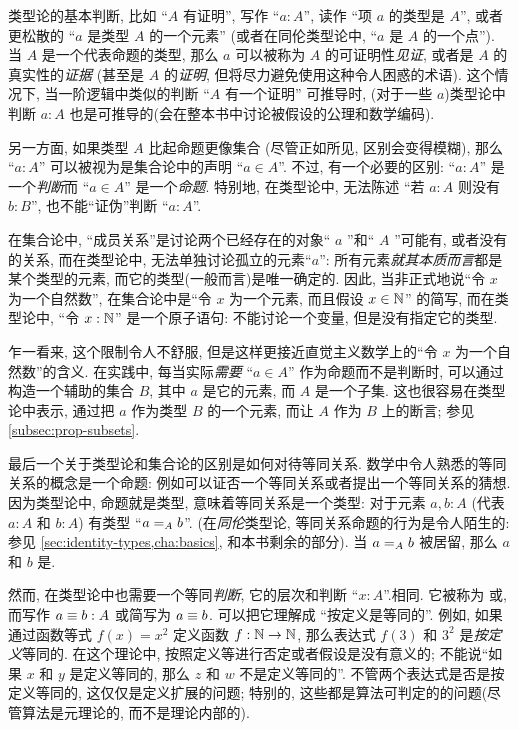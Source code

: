 类型论的基本判断, 比如 ``$A$ 有证明'', 写作 ``$a:A$'', 读作 ``项 $a$ 的类型是 $A$'', 或者更松散的 ``$a$ 是类型 $A$ 的一个元素'' (或者在同伦类型论中, ``$a$ 是 $A$ 的一个点'').
%
%
%
当 $A$ 是一个代表命题的类型, 那么 $a$ 可以被称为 $A$ 的可证明性\emph{见证}, 或者是 $A$ 的真实性的\emph{证据} (甚至是 $A$ 的\emph{证明}, 但将尽力避免使用这种令人困惑的术语).
这个情况下, 当一阶逻辑中类似的判断 ``$A$ 有一个证明'' 可推导时, (对于一些 $a$)类型论中判断 $a:A$ 也是可推导的(会在整本书中讨论被假设的公理和数学编码).

另一方面, 如果类型 $A$ 比起命题更像集合 (尽管正如所见, 区别会变得模糊), 那么 ``$a:A$'' 可以被视为是集合论中的声明 ``$a\in A$''.
不过, 有一个必要的区别: ``$a:A$'' 是一个\emph{判断}而 ``$a\in A$'' 是一个\emph{命题}.
特别地, 在类型论中, 无法陈述 ``若 $a:A$ 则没有 $b:B$'', 也不能``证伪''判断 ``$a:A$''.

在集合论中, ``成员关系''是讨论两个已经存在的对象`` $a$ ''和`` $A$ ''可能有, 或者没有的关系, 而在类型论中, 无法单独讨论孤立的元素``$a$'': 所有元素\emph{就其本质而言}都是某个类型的元素, 而它的类型(一般而言)是唯一确定的.
因此, 当非正式地说``令 $x$ 为一个自然数'', 在集合论中是``令 $x$ 为一个元素, 而且假设 $x\in\nat$'' 的简写, 而在类型论中, ``令 $x:\nat$'' 是一个原子语句: 不能讨论一个变量, 但是没有指定它的类型.
%

乍一看来, 这个限制令人不舒服, 但是这样更接近直觉主义数学上的``令 $x$ 为一个自然数''的含义.
在实践中, 每当实际\emph{需要} ``$a\in A$'' 作为命题而不是判断时, 可以通过构造一个辅助的集合 $B$, 其中 $a$ 是它的元素, 而 $A$ 是一个子集.
这也很容易在类型论中表示, 通过把 $a$ 作为类型 $B$ 的一个元素, 而让 $A$ 作为 $B$ 上的断言;
参见\cref{subsec:prop-subsets}.

最后一个关于类型论和集合论的区别是如何对待等同关系.
数学中令人熟悉的等同关系的概念是一个命题: 例如可以证否一个等同关系或者提出一个等同关系的猜想.
因为类型论中, 命题就是类型, 意味着等同关系是一个类型: 对于元素 $a,b:A$ (代表 $a:A$ 和 $b:A$) 有类型 ``$\id[A]ab$''.
(在\emph{同伦}类型论, 等同关系命题的行为是令人陌生的: 参见 \cref{sec:identity-types,cha:basics}, 和本书剩余的部分).
当 $\id[A]ab$ 被居留, 那么 $a$ 和 $b$ 是. %
%

然而, 在类型论中也需要一个等同\emph{判断}, 它的层次和判断 ``$x:A$''.相同.
%
%
它被称为
%
%
或,
%
%
而写作 $a\jdeq b : A$ 或简写为 $a \jdeq b$.
可以把它理解成 ``按定义是等同的''.
例如, 如果通过函数等式 $f(x)=x^2$ 定义函数 $f:\nat\to\nat$, 那么表达式 $f(3)$ 和 $3^2$ 是\emph{按定义}等同的.
在这个理论中, 按照定义等进行否定或者假设是没有意义的;
不能说``如果 $x$ 和 $y$ 是定义等同的, 那么 $z$ 和 $w$ 不是定义等同的''.
不管两个表达式是否是按定义等同的, 这仅仅是定义扩展的问题;
特别的, 这些都是算法可判定的的问题(尽管算法是元理论的, 而不是理论内部的).
%

